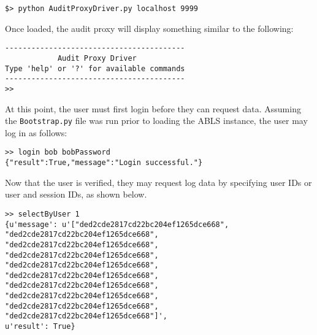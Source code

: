 \begin{lstlisting}
$> python AuditProxyDriver.py localhost 9999
\end{lstlisting}

Once loaded, the audit proxy will display something similar to the following:

\begin{lstlisting}
-----------------------------------------
            Audit Proxy Driver           
Type 'help' or '?' for available commands
-----------------------------------------
>> 
\end{lstlisting}

At this point, the user must first login before they can request data. Assuming the {\tt Bootstrap.py} file was 
run prior to loading the ABLS instance, the user may log in as follows:

\begin{lstlisting}
>> login bob bobPassword
{"result":True,"message":"Login successful."}
\end{lstlisting}

Now that the user is verified, they may request log data by specifying user IDs or user and session IDs, as shown below.

\begin{lstlisting}
>> selectByUser 1
{u'message': u'["ded2cde2817cd22bc204ef1265dce668", 
"ded2cde2817cd22bc204ef1265dce668", 
"ded2cde2817cd22bc204ef1265dce668", 
"ded2cde2817cd22bc204ef1265dce668", 
"ded2cde2817cd22bc204ef1265dce668", 
"ded2cde2817cd22bc204ef1265dce668", 
"ded2cde2817cd22bc204ef1265dce668", 
"ded2cde2817cd22bc204ef1265dce668", 
"ded2cde2817cd22bc204ef1265dce668", 
"ded2cde2817cd22bc204ef1265dce668"]', 
u'result': True}
\end{lstlisting}

